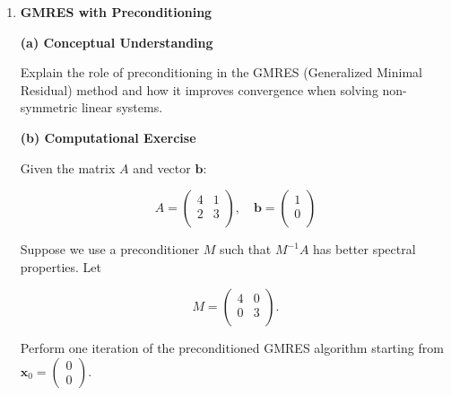 \documentclass[
]{article}
\begin{document}
\begin{enumerate}
\def\labelenumi{\arabic{enumi}.}
\setcounter{enumi}{6}
\item
  \textbf{GMRES with Preconditioning}

  \textbf{(a) Conceptual Understanding}

  Explain the role of preconditioning in the GMRES (Generalized Minimal
  Residual) method and how it improves convergence when solving
  non-symmetric linear systems.

  \vspace{7cm}

  \textbf{(b) Computational Exercise}

  Given the matrix \(A\) and vector \(\mathbf{b}\):

  \[
  A = \begin{pmatrix}
  4 & 1 \\
  2 & 3 \\
  \end{pmatrix}, \quad
  \mathbf{b} = \begin{pmatrix}
  1 \\
  0 \\
  \end{pmatrix}
  \]

  Suppose we use a preconditioner \(M\) such that \(M^{-1}A\) has better
  spectral properties. Let

  \[
  M = \begin{pmatrix}
  4 & 0 \\
  0 & 3 \\
  \end{pmatrix}.
  \]

  Perform one iteration of the preconditioned GMRES algorithm starting
  from \(\mathbf{x}_0 = \begin{pmatrix} 0 \\ 0 \end{pmatrix}\).
\end{enumerate}
\end{document}
